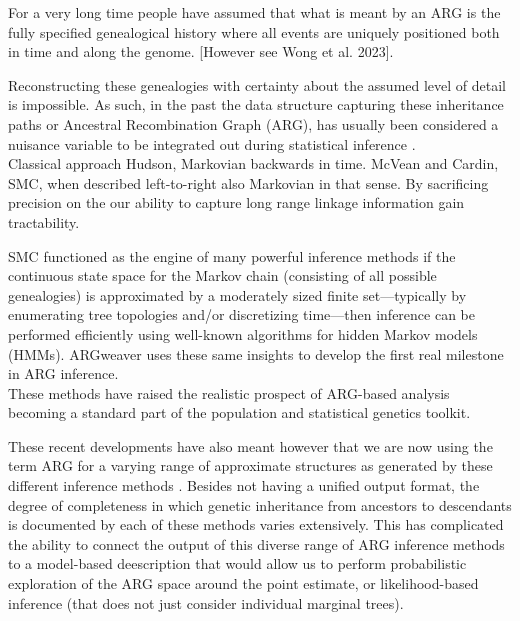 \documentclass{article}
\begin{document}
For a very long time people have assumed that what is meant by an ARG is the 
fully specified genealogical history  
where all events are uniquely positioned both in time
and along the genome. [However see Wong et al. 2023].


Reconstructing these genealogies with certainty about the assumed level of detail 
is impossible.
As such, in the past the data structure capturing these inheritance paths 
or Ancestral Recombination Graph (ARG), has usually been considered a nuisance 
variable to be integrated out during statistical inference 
\citep{kuhner_2000, griffiths_ancestral_1996}.\\
 

Classical approach Hudson, Markovian backwards in time.
McVean and Cardin, SMC, when described left-to-right also Markovian 
in that sense. By sacrificing precision on the our ability to capture long 
range linkage information gain tractability. 

SMC functioned as the engine of many powerful inference methods 
if the continuous state space for the Markov chain 
(consisting of all possible genealogies) is approximated by a moderately 
sized finite set—typically by enumerating tree topologies and/or discretizing 
time—then inference can be performed efficiently using well-known algorithms 
for hidden Markov models (HMMs).
ARGweaver uses these same insights to develop the first real milestone in ARG inference.\\






These methods
have raised the realistic prospect of ARG-based analysis becoming a standard 
part of the population and statistical genetics toolkit.

These recent developments have also meant however that
we are now using the term ARG for a varying range of approximate structures 
as generated by these different inference methods \citep{wong_a-general_2023}. 
Besides not having a unified output format, the degree of completeness 
in which genetic inheritance from ancestors to 
descendants is documented by each of these methods varies extensively.
This has complicated the ability to connect the output of this diverse range of 
ARG inference methods to a model-based deescription that would allow us to perform  
probabilistic exploration of the ARG space around the point estimate, 
or likelihood-based inference (that does not just consider individual marginal trees).
\end{document}
